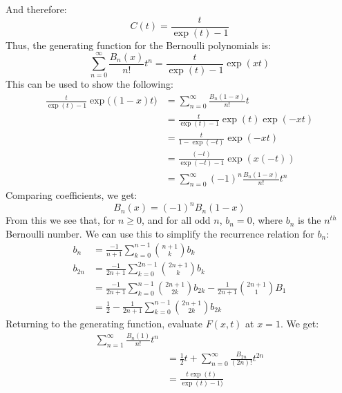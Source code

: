             And therefore:
            \begin{equation}
                C(t)=\frac{t}{\exp(t)-1}
            \end{equation}
            Thus, the generating function for the Bernoulli
            polynomials is:
            \begin{equation}
                \sum_{n=0}^{\infty}
                \frac{B_{n}(x)}{n!}t^{n}
                =\frac{t}{\exp(t)-1}\exp(xt)
            \end{equation}
            This can be used to show the following:
            \begin{align}
                \frac{t}{\exp(t)-1}
                \exp\big((1-x)t\big)
                &=\sum_{n=0}^{\infty}
                    \frac{B_{n}(1-x)}{n!}t^{}\\
                &=\frac{t}{\exp(t)-1}\exp(t)\exp(-xt)\\
                &=\frac{t}{1-\exp(-t)}\exp(-xt)\\
                &=\frac{(-t)}{\exp(-t)-1}\exp(x(-t))\\
                &=\sum_{n=0}^{\infty}(-1)^{n}
                \frac{B_{n}(1-x)}{n!}t^{n}
            \end{align}
            Comparing coefficients, we get:
            \begin{equation}
                B_{n}(x)=(-1)^{n}B_{n}(1-x)
            \end{equation}
            From this we see that, for $n\geq{0}$, and for all
            odd $n$, $b_{n}=0$, where $b_{n}$ is the
            $n^{th}$ Bernoulli number. We can use this to simplify
            the recurrence relation for $b_{n}$:
            \begin{align}
                b_{n}&=\frac{-1}{n+1}
                \sum_{k=0}^{n-1}\binom{n+1}{k}b_{k}\\
                b_{2n}&=\frac{-1}{2n+1}
                \sum_{k=0}^{2n-1}\binom{2n+1}{k}b_{k}\\
                &=\frac{-1}{2n+1}\sum_{k=0}^{n-1}
                    \binom{2n+1}{2k}b_{2k}
                    -\frac{1}{2n+1}\binom{2n+1}{1}B_{1}\\
                    &=\frac{1}{2}-\frac{1}{2n+1}
                    \sum_{k=0}^{n-1}\binom{2n+1}{2k}b_{2k}
            \end{align}
            Returning to the generating function, evaluate
            $F(x,t)$ at $x=1$. We get:
            \begin{align}
                \sum_{n=1}^{\infty}\frac{B_{n}(1)}{n!}t^{n}\\
                &=\frac{1}{2}t+\sum_{n=0}^{\infty}
                \frac{B_{2n}}{(2n)!}t^{2n}\\
                &=\frac{t\exp(t)}{\exp(t)-1)}
            \end{align}
